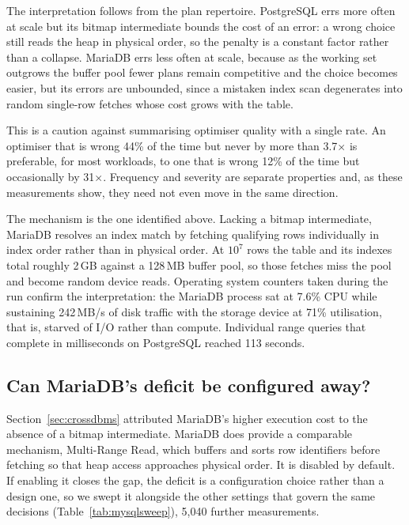 \documentclass[preprint,12pt,authoryear]{elsarticle}
\begin{document}
The interpretation follows from the plan repertoire. PostgreSQL errs
more often at scale but its bitmap intermediate bounds the cost of an
error: a wrong choice still reads the heap in physical order, so the
penalty is a constant factor rather than a collapse. MariaDB errs less
often at scale, because as the working set outgrows the buffer pool
fewer plans remain competitive and the choice becomes easier, but its
errors are unbounded, since a mistaken index scan degenerates into
random single-row fetches whose cost grows with the table.

This is a caution against summarising optimiser quality with a single
rate. An optimiser that is wrong 44\% of the time but never by more than
3.7$\times$ is preferable, for most workloads, to one that is wrong 12\%
of the time but occasionally by 31$\times$. Frequency and severity are
separate properties and, as these measurements show, they need not even
move in the same direction.

The mechanism is the one identified above. Lacking a bitmap intermediate,
MariaDB resolves an index match by fetching qualifying rows individually
in index order rather than in physical order. At $10^7$ rows the table and
its indexes total roughly 2\,GB against a 128\,MB buffer pool, so those
fetches miss the pool and become random device reads. Operating system
counters taken during the run confirm the interpretation: the MariaDB
process sat at 7.6\% CPU while sustaining 242\,MB/s of disk traffic with
the storage device at 71\% utilisation, that is, starved of I/O rather
than compute. Individual range queries that complete in milliseconds on
PostgreSQL reached 113 seconds.

\subsection{Can MariaDB's deficit be configured away?}
\label{sec:mysqlsweep}

Section~\ref{sec:crossdbms} attributed MariaDB's higher execution cost
to the absence of a bitmap intermediate. MariaDB does provide a
comparable mechanism, Multi-Range Read, which buffers and sorts row
identifiers before fetching so that heap access approaches physical
order. It is disabled by default. If enabling it closes the gap, the
deficit is a configuration choice rather than a design one, so we swept
it alongside the other settings that govern the same decisions
(Table~\ref{tab:mysqlsweep}), 5{,}040 further measurements.
\end{document}
